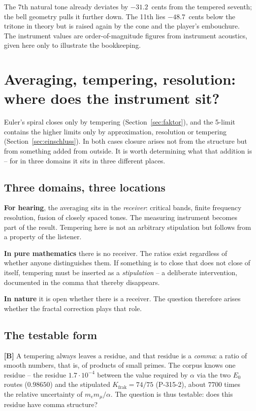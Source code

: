 The 7th natural tone already deviates by $-31.2$~cents from the
tempered seventh; the bell geometry pulls it further down. The 11th
lies $-48.7$~cents below the tritone in theory but is raised again by
the cone and the player's embouchure. The instrument values are
order-of-magnitude figures from instrument acoustics, given here only
to illustrate the bookkeeping.

\section{Averaging, tempering, resolution: where does the instrument sit?}
\label{sec:instrument}

Euler's spiral closes only by tempering (Section~\ref{sec:faktor}), and
the 5-limit contains the higher limits only by approximation,
resolution or tempering (Section~\ref{sec:einschluss}). In both cases
closure arises not from the structure but from something added from
outside. It is worth determining what that addition is -- for in three
domains it sits in three different places.

\subsection{Three domains, three locations}

\textbf{For hearing}, the averaging sits in the \emph{receiver}:
critical bands, finite frequency resolution, fusion of closely spaced
tones. The measuring instrument becomes part of the result. Tempering
here is not an arbitrary stipulation but follows from a property of the
listener.

\textbf{In pure mathematics} there is no receiver. The ratios exist
regardless of whether anyone distinguishes them. If something is to
close that does not close of itself, tempering must be inserted as a
\emph{stipulation} -- a deliberate intervention, documented in the
comma that thereby disappears.

\textbf{In nature} it is open whether there is a receiver. The question
therefore arises whether the fractal correction plays that role.

\subsection{The testable form}

\textbf{[B]} A tempering always leaves a residue, and that residue is a
\emph{comma}: a ratio of smooth numbers, that is, of products of small
primes. The corpus knows one residue -- the
residue $1.7\cdot10^{-4}$ between the value required by $\alpha$ via the two $E_0$ routes ($0.98650$)
and the stipulated $K_\text{frak} = 74/75$ (P-315-2), about $7700$ times the relative uncertainty
of $m_e m_\mu/\alpha$. The question is thus testable:
does this residue have comma structure?

